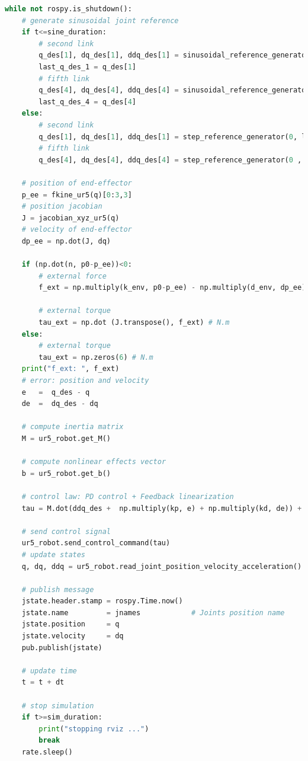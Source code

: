 \begin{lstlisting}[language=Python,caption={Move the second and fifth joint of UR5 robot with the required movement of activity 2.7.2.}, label={lst:inverse_dynamics_unilateral_compliant_contact_xyz}]
while not rospy.is_shutdown():
    # generate sinusoidal joint reference
    if t<=sine_duration:
        # second link
        q_des[1], dq_des[1], ddq_des[1] = sinusoidal_reference_generator(q0[1], 0.2, 1, t)
        last_q_des_1 = q_des[1]
        # fifth link
        q_des[4], dq_des[4], ddq_des[4] = sinusoidal_reference_generator(q0[4], 0.4, 1.5, t)  
        last_q_des_4 = q_des[4]  
    else:
        # second link
        q_des[1], dq_des[1], ddq_des[1] = step_reference_generator(0, last_q_des_1)
        # fifth link
        q_des[4], dq_des[4], ddq_des[4] = step_reference_generator(0 , last_q_des_4)

    # position of end-effector
    p_ee = fkine_ur5(q)[0:3,3]
    # position jacobian
    J = jacobian_xyz_ur5(q)    
    # velocity of end-effector
    dp_ee = np.dot(J, dq)

    if (np.dot(n, p0-p_ee))<0:
        # external force
        f_ext = np.multiply(k_env, p0-p_ee) - np.multiply(d_env, dp_ee) # N

        # external torque 
        tau_ext = np.dot (J.transpose(), f_ext) # N.m
    else:
        # external torque 
        tau_ext = np.zeros(6) # N.m
    print("f_ext: ", f_ext)
    # error: position and velocity
    e 	=  q_des - q
    de 	=  dq_des - dq    

    # compute inertia matrix
    M = ur5_robot.get_M()

    # compute nonlinear effects vector
    b = ur5_robot.get_b()   

    # control law: PD control + Feedback linearization
    tau = M.dot(ddq_des +  np.multiply(kp, e) + np.multiply(kd, de)) + b + tau_ext
    
    # send control signal   
    ur5_robot.send_control_command(tau)
    # update states
    q, dq, ddq = ur5_robot.read_joint_position_velocity_acceleration()

    # publish message
    jstate.header.stamp = rospy.Time.now()
    jstate.name 		= jnames			# Joints position name
    jstate.position 	= q
    jstate.velocity 	= dq
    pub.publish(jstate)

    # update time
    t = t + dt

    # stop simulation
    if t>=sim_duration:
        print("stopping rviz ...")
        break
    rate.sleep()
\end{lstlisting}


